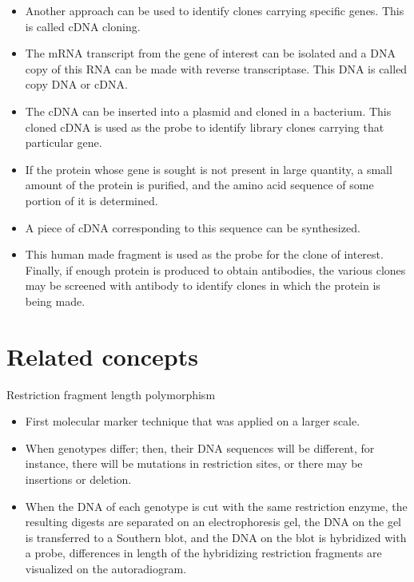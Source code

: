 \documentclass[11pt,dvipsnames,ignorenonframetext,aspectratio=169]{beamer}
\providecommand{\tightlist}{%
  \setlength{\itemsep}{0pt}\setlength{\parskip}{0pt}}
\begin{document}
\begin{frame}{}
\protect\hypertarget{section-23}{}
\begin{itemize}
\tightlist
\item
  Another approach can be used to identify clones carrying specific
  genes. This is called cDNA cloning.
\item
  The mRNA transcript from the gene of interest can be isolated and a
  DNA copy of this RNA can be made with reverse transcriptase. This DNA
  is called copy DNA or cDNA.
\item
  The cDNA can be inserted into a plasmid and cloned in a bacterium.
  This cloned cDNA is used as the probe to identify library clones
  carrying that particular gene.
\item
  If the protein whose gene is sought is not present in large quantity,
  a small amount of the protein is purified, and the amino acid sequence
  of some portion of it is determined.
\item
  A piece of cDNA corresponding to this sequence can be synthesized.
\item
  This human made fragment is used as the probe for the clone of
  interest. Finally, if enough protein is produced to obtain antibodies,
  the various clones may be screened with antibody to identify clones in
  which the protein is being made.
\end{itemize}
\end{frame}

\hypertarget{related-concepts}{%
\section{Related concepts}\label{related-concepts}}

\begin{frame}{Restriction fragment length polymorphism}
\protect\hypertarget{restriction-fragment-length-polymorphism}{}
\begin{itemize}
\tightlist
\item
  First molecular marker technique that was applied on a larger scale.
\item
  When genotypes differ; then, their DNA sequences will be different,
  for instance, there will be mutations in restriction sites, or there
  may be insertions or deletion.
\item
  When the DNA of each genotype is cut with the same restriction enzyme,
  the resulting digests are separated on an electrophoresis gel, the DNA
  on the gel is transferred to a Southern blot, and the DNA on the blot
  is hybridized with a probe, differences in length of the hybridizing
  restriction fragments are visualized on the autoradiogram.
\end{itemize}
\end{frame}
\end{document}
